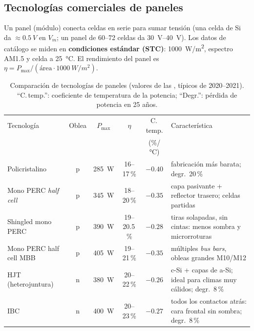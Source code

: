 \subsection{Tecnologías comerciales de paneles}

Un panel (módulo) conecta celdas en serie para sumar tensión (una celda de Si da
$\approx\SI{0.5}{V}$ en $V_m$; un panel de 60--72 celdas da \SIrange{30}{40}{V}). Los datos
de catálogo se miden en \textbf{condiciones estándar (STC)}: \SI{1000}{W/m^2}, espectro
AM1.5 y celda a \SI{25}{\celsius}. El rendimiento del panel es
$\eta=P_{\max}/(\text{área}\cdot\SI{1000}{W/m^2})$.

\begin{table}[H]
\centering\small
\caption{Comparación de tecnologías de paneles (valores de las , típicos de
2020--2021). ``C.\,temp.'': coeficiente de temperatura de la potencia; ``Degr.'':
pérdida de potencia en 25 años.}
\label{tab:paneles}
\begin{tabularx}{\textwidth}{lccccX}
\toprule
Tecnología & Oblea & $P_{\max}$ & $\eta$ & C.\,temp. & Característica \\
           &       &           &        & (\%/\si{\celsius}) & \\
\midrule
Policristalino           & p & \SI{285}{W} & 16--17\,\% & $-0.40$ & fabricación más barata; degr.\ 20\,\% \\
Mono PERC \emph{half cell} & p & \SI{345}{W} & 18--20\,\% & $-0.35$ & capa pasivante + reflector trasero; celdas partidas \\
Shingled mono PERC       & p & \SI{390}{W} & 19--20.5\,\% & $-0.28$ & tiras solapadas, sin cintas: menos sombra y microrroturas \\
Mono PERC half cell MBB  & p & \SI{405}{W} & 19--21\,\% & $-0.35$ & múltiples \emph{bus bars}, obleas grandes M10/M12 \\
HJT (heterojuntura)      & n & \SI{380}{W} & 20--22\,\% & $-0.26$ & c-Si + capas de a-Si; ideal para climas muy cálidos; degr.\ 8\,\% \\
IBC                      & n & \SI{400}{W} & 20--23\,\% & $-0.27$ & todos los contactos atrás: cara frontal sin sombra; degr.\ 8\,\% \\
\bottomrule
\end{tabularx}
\end{table}

